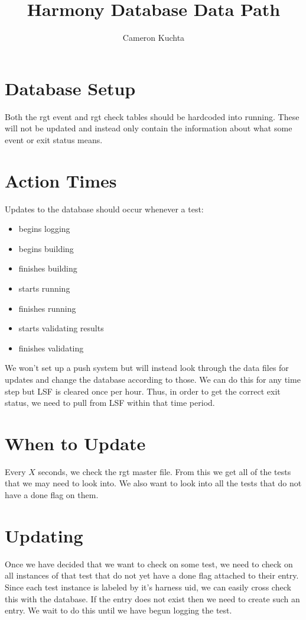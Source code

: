 \documentclass{article}
\title{Harmony Database Data Path}
\author{Cameron Kuchta}
\begin{document}
\maketitle

\section{Database Setup}

Both the rgt event and rgt check tables should be hardcoded into running. These will not be updated and instead only contain the information about what some event or exit status means.

\section{Action Times}

Updates to the database should occur whenever a test:
\begin{itemize}
	\item begins logging
	\item begins building
	\item finishes building
	\item starts running
	\item finishes running
	\item starts validating results
	\item finishes validating
\end{itemize}

We won't set up a push system but will instead look through the data files for updates and change the database according to those. We can do this for any time step but LSF is cleared once per hour. Thus, in order to get the correct exit status, we need to pull from LSF within that time period.

\section{When to Update}

Every $X$ seconds, we check the rgt master file. From this we get all of the tests that we may need to look into. We also want to look into all the tests that do not have a done flag on them.

\section{Updating}

Once we have decided that we want to check on some test, we need to check on all instances of that test that do not yet have a done flag attached to their entry. Since each test instance is labeled by it's harness uid, we can easily cross check this with the database. If the entry does not exist then we need to create such an entry. We wait to do this until we have begun logging the test.
\end{document}
